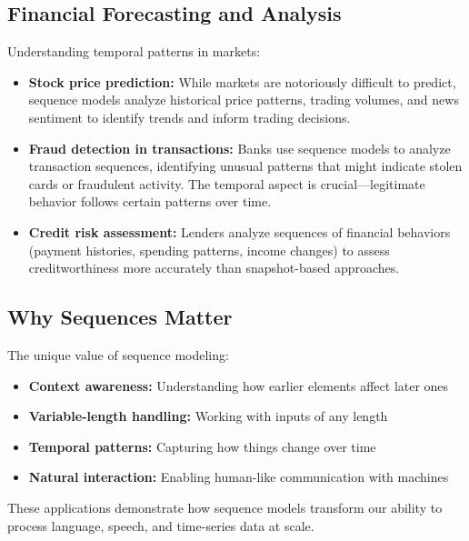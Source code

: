 \subsection{Financial Forecasting and Analysis}

Understanding temporal patterns in markets:

\begin{itemize}
    \item \textbf{Stock price prediction:} While markets are notoriously difficult to predict, sequence models analyze historical price patterns, trading volumes, and news sentiment to identify trends and inform trading decisions.
    
    \item \textbf{Fraud detection in transactions:} Banks use sequence models to analyze transaction sequences, identifying unusual patterns that might indicate stolen cards or fraudulent activity. The temporal aspect is crucial—legitimate behavior follows certain patterns over time.
    
    \item \textbf{Credit risk assessment:} Lenders analyze sequences of financial behaviors (payment histories, spending patterns, income changes) to assess creditworthiness more accurately than snapshot-based approaches.
\end{itemize}

\subsection{Why Sequences Matter}

The unique value of sequence modeling:
\begin{itemize}
    \item \textbf{Context awareness:} Understanding how earlier elements affect later ones
    \item \textbf{Variable-length handling:} Working with inputs of any length
    \item \textbf{Temporal patterns:} Capturing how things change over time
    \item \textbf{Natural interaction:} Enabling human-like communication with machines
\end{itemize}

These applications demonstrate how sequence models transform our ability to process language, speech, and time-series data at scale.

